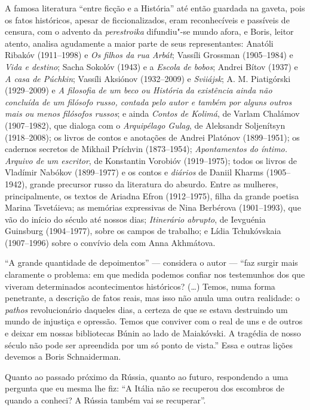 A famosa literatura ``entre ficção e a História'' até então guardada na
gaveta, pois os fatos históricos, apesar de ficcionalizados, eram
reconhecíveis e passíveis de censura, com o advento da
\emph{perestroika} difundiu"-se mundo afora, e Boris, leitor atento,
analisa agudamente a maior parte de seus representantes: Anatóli Ribakóv
(1911--1998) e \emph{Os filhos da rua Arbát}; Vassíli Grossman
(1905--1984) e \emph{Vida e destino}; Sacha Sokolóv (1943) e a
\emph{Escola de bobos}; Andrei Bítov (1937) e \emph{A casa de Púchkin};
Vassíli Aksiónov (1932--2009) e \emph{Sviiájsk}; A. M. Piatigórski
(1929--2009) e \emph{A filosofia de um beco ou História da existência
ainda não concluída de um filósofo russo, contada pelo autor e também
por alguns outros mais ou menos filósofos russos}; e ainda
\emph{Contos de Kolimá}, de Varlam Chalámov (1907--1982), que dialoga com o \emph{Arquipélago Gulag}, de Aleksandr Soljenítsyn (1918--2008); os
livros de contos e anotações de Andrei Platónov (1899--1951); os cadernos
secretos de Mikhail Príchvin (1873--1954); \emph{Apontamentos do íntimo.
Arquivo de um escritor}, de Konstantin Vorobióv (1919--1975); todos os
livros de Vladímir Nabókov (1899--1977) e os contos e \emph{diários} de
Daniil Kharms (1905--1942), grande precursor russo da literatura do
absurdo. Entre as mulheres, principalmente, os textos de Ariadna Efron
(1912--1975), filha da grande poetisa Marina Tsvetáieva; as memórias
expressivas de Nina Berbérova (1901--1993), que vão do início do século
até nossos dias; \emph{Itinerário abrupto}, de Ievguénia Guinsburg
(1904--1977), sobre os campos de trabalho; e Lídia Tchukóvskaia
(1907--1996) sobre o convívio dela com Anna Akhmátova.

``A grande quantidade de depoimentos'' --- considera o autor --- ``faz
surgir mais claramente o problema: em que medida podemos confiar nos
testemunhos dos que viveram determinados acontecimentos históricos?
(\ldots{}) Temos, numa forma penetrante, a descrição de fatos reais, mas
isso não anula uma outra realidade: o \emph{pathos} revolucionário
daqueles dias, a certeza de que se estava destruindo um mundo de
injustiça e opressão. Temos que conviver com o real de uns e de outros e
deixar em nossas bibliotecas Búnin ao lado de Maiakóvski. A tragédia de
nosso século não pode ser apreendida por um só ponto de vista.'' Essa e
outras lições devemos a Boris Schnaiderman.

Quanto ao passado próximo da Rússia, quanto ao futuro, respondendo a uma
pergunta que eu mesma lhe fiz: ``A Itália não se recuperou dos escombros
de quando a conheci? A Rússia também vai se recuperar''.



